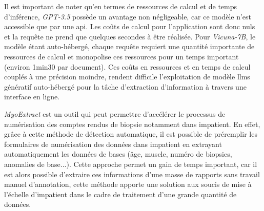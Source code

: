 Il est important de noter qu'en termes de ressources de calcul et de temps d'inférence, \textit{GPT-3.5} possède un avantage non négligeable, car ce modèle n'est accessible que par une \gls{api}. Les coûts de calcul pour l'application sont donc nuls et la requête ne prend que quelques secondes à être réalisée. Pour \textit{Vicuna-7B}, le modèle étant auto-hébergé, chaque requête requiert une quantité importante de ressources de calcul et monopolise ces ressources pour un temps important (environ 1min30 par document). Ces coûts en ressources et en temps de calcul couplés à une précision moindre, rendent difficile l'exploitation de modèle \gls{llms} génératif auto-hébergé pour la tâche d'extraction d'information à travers une interface en ligne. 

\textit{MyoExtract} est un outil qui peut permettre d'accélérer le processus de numérisation des comptes rendus de biopsie notamment dans \gls{impatient}. En effet, grâce à cette méthode de détection automatique, il est possible de préremplir les formulaires de numérisation des données dans \gls{impatient} en extrayant automatiquement les données de bases (âge, muscle, numéro de biopsies, anomalies de base...). Cette approche permet un gain de temps important, car il est alors possible d'extraire ces informations d'une masse de rapports sans travail manuel d'annotation, cette méthode apporte une solution aux soucis de mise à l'échelle d'\gls{impatient} dans le cadre de traitement d'une grande quantité de données.

